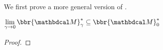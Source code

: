 We first prove a more general version of .
\begin{lemma}
$\lim\limits_{\gamma\to0}\bbr{\dg M}_\gamma^* \subseteq \bbr{\dg M}_0^*$ 
\end{lemma}
\begin{proof}
\def\lb{k}
\def\ub{K}  


\end{proof}
